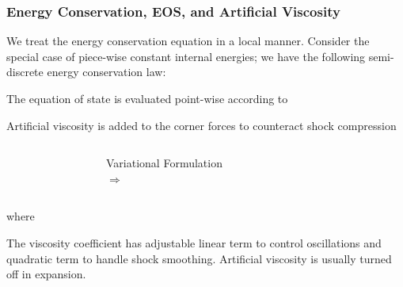 \documentclass[8pt,xcolor=svgnames]{beamer}
\begin{document}
\begin{frame}
 \frametitle{Energy Conservation, EOS, and Artificial Viscosity}
We treat the energy conservation equation in a local manner. Consider the special case of piece-wise
constant internal energies; we have the following semi-discrete energy conservation law: \vspace{-2ex}
\begin{center}
\end{center}

\bigskip
The equation of state is evaluated point-wise according to \hspace*{3ex} 

\bigskip
Artificial viscosity is added to the corner forces to counteract shock compression
\medskip
\begin{columns}
\begin{column}{0.3\textwidth}
\centering
{}
\end{column}
\begin{column}{0.2\textwidth}
\centering
\footnotesize{Variational Formulation} \\
\Large{$\Longrightarrow$}
\end{column}
\begin{column}{0.4\textwidth}
\centering
{}
\end{column}
\end{columns}

\medskip
 where \hspace*{3ex} 

\medskip
The viscosity coefficient has adjustable linear term to control oscillations and quadratic term to handle shock smoothing. Artificial viscosity is usually turned off in expansion.
\end{frame}

\end{document}
